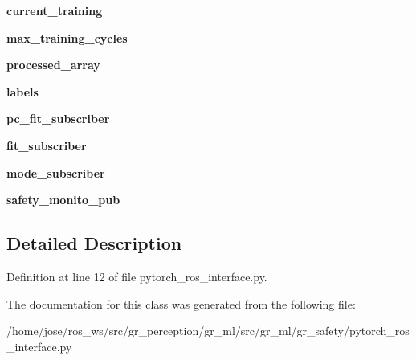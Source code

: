 \begin{DoxyCompactItemize}
{\bfseries current\+\_\+training}
\item 
\mbox{\label{classgr__ml_1_1gr__safety_1_1pytorch__ros__interface_1_1PyTorchWrapper_af5c7666ee874d0b4afac68a0f0c70324}} 
{\bfseries max\+\_\+training\+\_\+cycles}
\item 
\mbox{\label{classgr__ml_1_1gr__safety_1_1pytorch__ros__interface_1_1PyTorchWrapper_ab0367a2ef2ecc0f0c51eec4e7d1b1480}} 
{\bfseries processed\+\_\+array}
\item 
\mbox{\label{classgr__ml_1_1gr__safety_1_1pytorch__ros__interface_1_1PyTorchWrapper_a3ff9515d575c8ca65da9f5f5e83a247c}} 
{\bfseries labels}
\item 
\mbox{\label{classgr__ml_1_1gr__safety_1_1pytorch__ros__interface_1_1PyTorchWrapper_a792d248ba33787ebeef87e6db24ccecb}} 
{\bfseries pc\+\_\+fit\+\_\+subscriber}
\item 
\mbox{\label{classgr__ml_1_1gr__safety_1_1pytorch__ros__interface_1_1PyTorchWrapper_aed2c440093f65bea685f0f4daec69451}} 
{\bfseries fit\+\_\+subscriber}
\item 
\mbox{\label{classgr__ml_1_1gr__safety_1_1pytorch__ros__interface_1_1PyTorchWrapper_a880f83af171caf1904bc29766437ddb0}} 
{\bfseries mode\+\_\+subscriber}
\item 
\mbox{\label{classgr__ml_1_1gr__safety_1_1pytorch__ros__interface_1_1PyTorchWrapper_a15e2e3f2131d2c86e0b8a7e3437626a6}} 
{\bfseries safety\+\_\+monito\+\_\+pub}
\end{DoxyCompactItemize}


\subsection{Detailed Description}


Definition at line 12 of file pytorch\+\_\+ros\+\_\+interface.\+py.



The documentation for this class was generated from the following file\+:\begin{DoxyCompactItemize}
\item 
/home/jose/ros\+\_\+ws/src/gr\+\_\+perception/gr\+\_\+ml/src/gr\+\_\+ml/gr\+\_\+safety/pytorch\+\_\+ros\+\_\+interface.\+py\end{DoxyCompactItemize}
